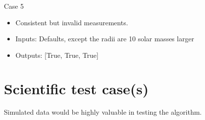 \documentclass[a4paper, oneside, 11pt, article, english]{memoir}
\begin{document}
Case 5
\begin{itemize}
    \firmlist
    \item Consistent but invalid measurements. 
     \item Inputs: Defaults, except the radii are 10 solar masses larger 
     \item Outputs: [True, True, True]
\end{itemize}

\section{Scientific test case(s)}
\label{sec:test-science}

Simulated data would be highly valuable in testing the algorithm. 



\end{document}
